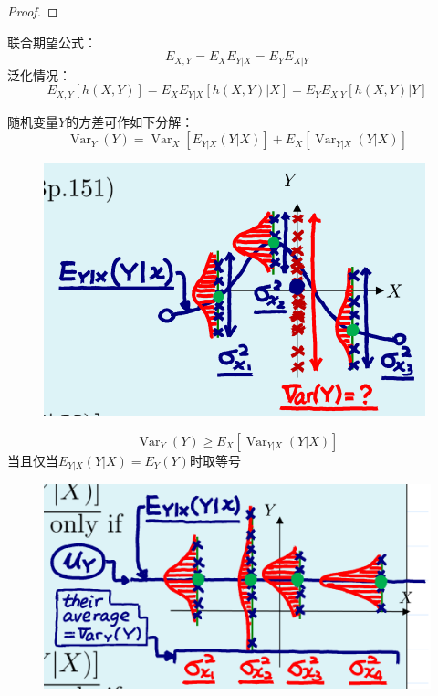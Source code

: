 \begin{proof}
\end{proof}

\begin{theorem}
    联合期望公式：
    \[ E_{X,Y}=E_X E_{Y|X} = E_Y E_{X|Y} \]
    泛化情况：
    \[ E_{X,Y}[h(X,Y)]=E_X E_{Y|X}[h(X,Y)|X] = E_Y E_{X|Y}[h(X,Y)|Y] \]
\end{theorem}

\begin{theorem}[重方差公式]\label{thm:var_dec}
    随机变量$Y$的方差可作如下分解：
    \[ \operatorname{Var}_Y(Y)=\operatorname{Var}_X[E_{Y|X}(Y|X)] + E_X[\operatorname{Var}_{Y|X}(Y|X)] \]
\end{theorem}

\begin{figure}
    \centering
    \includegraphics{image/var_dec.png}
\end{figure}

\begin{corollary}
    \[ \operatorname{Var}_Y(Y) \ge E_X[\operatorname{Var}_{Y|X}(Y|X)] \]
    当且仅当$E_{Y|X}(Y|X)=E_Y(Y)$时取等号
\end{corollary}

\begin{figure}
    \centering
    \includegraphics{image/var_dec2.png}
\end{figure}

